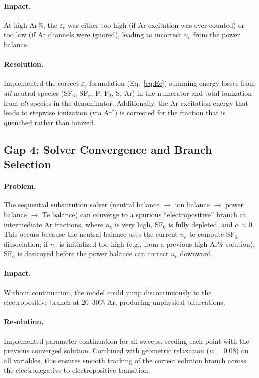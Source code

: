 \documentclass[11pt,a4paper]{article}
\newcommand{\ne}{n_e}
\begin{document}
\paragraph{Impact.} At high Ar\%, the $\varepsilon_c$ was either too high (if Ar excitation was over-counted) or too low (if Ar channels were ignored), leading to incorrect $\ne$ from the power balance.

\paragraph{Resolution.} Implemented the correct $\varepsilon_c$ formulation (Eq.~\ref{eq:Ec}) summing energy losses from \emph{all} neutral species (SF$_6$, SF$_x$, F, F$_2$, S, Ar) in the numerator and total ionization from \emph{all} species in the denominator.  Additionally, the Ar excitation energy that leads to stepwise ionization (via Ar$^*$) is corrected for the fraction that is quenched rather than ionized.

\subsection{Gap 4: Solver Convergence and Branch Selection}

\paragraph{Problem.} The sequential substitution solver (neutral balance $\to$ ion balance $\to$ power balance $\to$ Te balance) can converge to a spurious ``electropositive'' branch at intermediate Ar fractions, where $\ne$ is very high, SF$_6$ is fully depleted, and $\alpha \approx 0$.  This occurs because the neutral balance uses the current $\ne$ to compute SF$_6$ dissociation; if $\ne$ is initialized too high (e.g., from a previous high-Ar\% solution), SF$_6$ is destroyed before the power balance can correct $\ne$ downward.

\paragraph{Impact.} Without continuation, the model could jump discontinuously to the electropositive branch at 20--30\% Ar, producing unphysical bifurcations.

\paragraph{Resolution.} Implemented parameter continuation for all sweeps, seeding each point with the previous converged solution.  Combined with geometric relaxation ($w = 0.08$) on all variables, this ensures smooth tracking of the correct solution branch across the electronegative-to-electropositive transition.
\end{document}

